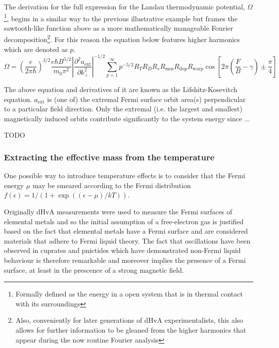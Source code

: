 The derivation for the full expression for the Landau thermodynamic potential, $\Omega$\footnote{Formally defined as the energy in a open system that is in thermal contact with its surroundings}, begins in a similar way to the previous illustrative example but frames the sawtooth-like function above as a more mathematically manageable Fourier decomposition\footnote{Also, conveniently for later generations of \ac{dHvA} experimentalists, this also allows for further information to be gleaned from the higher harmonics that appear during the now routine Fourier analysis}. For this reason the equation below features higher harmonics which are denoted as $p$.
\begin{equation}
\Omega = \left(\frac{e}{2\pi\hbar}\right)^{3/2}\frac{e\hbar B^{5/2}}{m_0 \pi^2}\left| \frac{\partial^2 a_{\textrm{ext}}}{\partial k^2_\perp}\right|^{-1/2}\sum_{p=1}^{\infty}p^{-5/2}R_T R_D R_s R_{\textrm{mos}} R_{\textrm{dop}} R_{\textrm{warp}} \cos\left[2\pi\left(\frac{F}{B} - \gamma\right)\pm\frac{\pi}{4}\right]
\end{equation}

The above equation and derivatives of it are known as the Lifshitz-Kosevitch equation. $a_{\textrm{ext}}$ is (one of) the extremal Fermi surface orbit area(s) perpendicular to a particular field direction. Only the extremal (i.e. the largest and smallest) magnetically induced orbits contribute significantly to the system energy since ...

TODO

\subsubsection{Extracting the effective mass from the temperature}


One possible way to introduce temperature effects is to consider that the Fermi energy $\mu$ may be smeared according to the Fermi distribution $f(\epsilon) = 1/(1+\exp((\epsilon-\mu)/kT))$.





Originally \ac{dHvA} measurements were used to measure the Fermi surfaces of elemental metals and so the initial assumption of a free-electron gas is justified based on the fact that elemental metals have a Fermi surface and are considered materials that adhere to Fermi liquid theory. The fact that oscillations have been observed in cuprates and pnictides which have demonstrated non-Fermi liquid behaviour is therefore remarkable and moreover implies the presence of a Fermi surface, at least in the prescence of a strong magnetic field.



